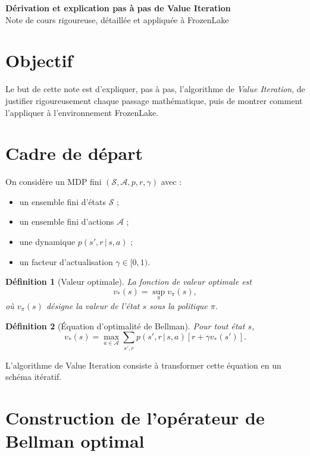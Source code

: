 \documentclass[11pt,a4paper]{article}
\newtheorem*{definition}{Définition}
\newcommand{\given}{\,|\,}
\begin{document}
\begin{center}
    {\LARGE\bfseries Dérivation et explication pas à pas de Value Iteration}\\[0.4em]
    {\large Note de cours rigoureuse, détaillée et appliquée à FrozenLake}
\end{center}

\vspace{0.6em}

\section{Objectif}

Le but de cette note est d'expliquer, pas à pas, l'algorithme de \emph{Value Iteration}, de justifier rigoureusement chaque passage mathématique, puis de montrer comment l'appliquer à l'environnement FrozenLake.

\section{Cadre de départ}

On considère un MDP fini $(\mathcal S,\mathcal A,p,r,\gamma)$ avec :
\begin{itemize}[leftmargin=1.6em]
    \item un ensemble fini d'états $\mathcal S$ ;
    \item un ensemble fini d'actions $\mathcal A$ ;
    \item une dynamique $p(s',r \given s,a)$ ;
    \item un facteur d'actualisation $\gamma \in [0,1)$.
\end{itemize}

\begin{definition}[Valeur optimale]
La fonction de valeur optimale est
\[
v_*(s) = \sup_{\pi} v_{\pi}(s),
\]
où $v_{\pi}(s)$ désigne la valeur de l'état $s$ sous la politique $\pi$.
\end{definition}

\begin{definition}[Équation d'optimalité de Bellman]
Pour tout état $s$,
\[
v_*(s)=\max_{a\in\mathcal A}\sum_{s',r} p(s',r\given s,a)\left[r+\gamma v_*(s')\right].
\]
\end{definition}

L'algorithme de Value Iteration consiste à transformer cette équation en un schéma itératif.

\section{Construction de l'opérateur de Bellman optimal}
\end{document}
